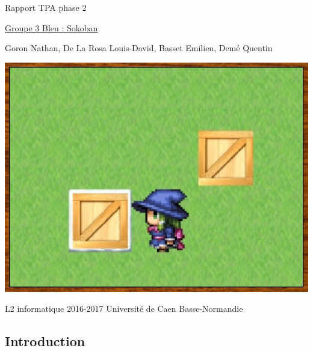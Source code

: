 \documentclass{article}
\begin{document}
\begin{titlepage}
\begin{center}
\Huge Rapport TPA phase 2

\normalsize
\vspace{0.5cm}
\Large {\underline{ Groupe 3 Bleu : Sokoban} }

\vspace{1cm}

\normalsize
Goron Nathan, De La Rosa Louis-David, Basset Emilien, Demé Quentin

\vspace{1cm}
\begin{center}
\includegraphics[scale=0.7]{img/main.jpg}
\end{center}
\vspace{3.5cm}
L2 informatique 2016-2017 Université de Caen Basse-Normandie
\end{center}
\end{titlepage}

\newpage
\tableofcontents

\newpage
\begin{center}
	\section{Introduction}
\end{center}
\end{document}
